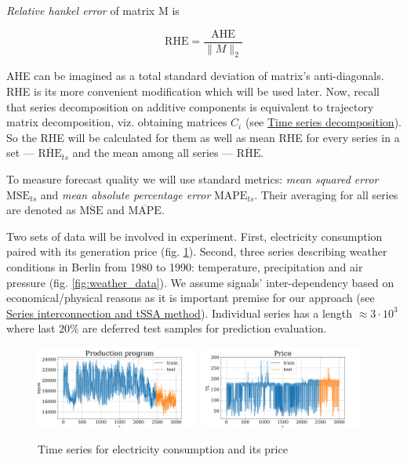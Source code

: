 	\begin{Def}		
		
		\emph{Relative hankel error} of matrix M is 
		
		\[
		\text{RHE} = \frac{\text{AHE}}{\lVert M \rVert_2} 
		\] 		
		
	\end{Def}
	
	AHE can be imagined as a total standard deviation of matrix's anti-diagonals. RHE is its more convenient modification which will be used later.	Now, recall that series decomposition on additive components is equivalent to trajectory matrix decomposition, viz. obtaining matrices $ C_i $ (see \hyperref[sec:decomposition]{Time series decomposition}). So the RHE will be calculated for them as well as mean RHE for every series in a set --- $ \overline{\text{RHE}}_{ts} $ and the mean among all series --- $ \overline{\text{RHE}} $. 
	
	To measure forecast quality we will use standard metrics: \emph{mean squared error} $ \text{MSE}_{ts} $ and \emph{mean absolute percentage error} $ \text{MAPE}_{ts} $. Their averaging for all series are denoted as $ \overline{\text{MSE}} $ and $ \overline{\text{MAPE}} $.
	
	Two sets of data will be involved in experiment. First, electricity consumption paired with its generation price (fig. \ref{fig:electr_data}). Second, three series describing weather conditions in Berlin from 1980 to 1990: temperature, precipitation and air pressure (fig. \ref{fig:weather_data}). We assume signals' inter-dependency based on economical/physical reasons as it is important premise for our approach (see \hyperref[sec:tssa_method]{Series interconnection and tSSA method}). Individual series has a length $ \approx 3 \cdot 10^3 $ where last $ 20\% $ are deferred test samples for prediction evaluation.
	
	\begin{figure}[h]
		\centering
		\includegraphics[width=0.48\textwidth, keepaspectratio]{../../figs/Electricity_Production}
		\includegraphics[width=0.48\textwidth, keepaspectratio]{../../figs/Electricity_Price}
		\caption{Time series for electricity consumption and its price}\label{fig:electr_data}
	\end{figure}
	
